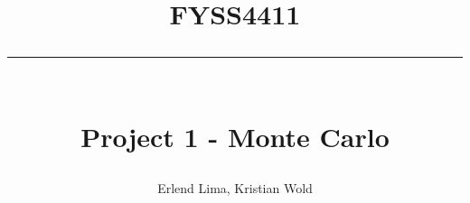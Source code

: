 \newcommand{\horrule}[1]{\rule{\linewidth}{#1}} %

\title{
\large \textsc{FYSS4411} \\ [25pt]
\horrule{0.5pt} \\[0.4cm]
\huge Project 1 - Monte Carlo}

\author{Erlend Lima, Kristian Wold}

